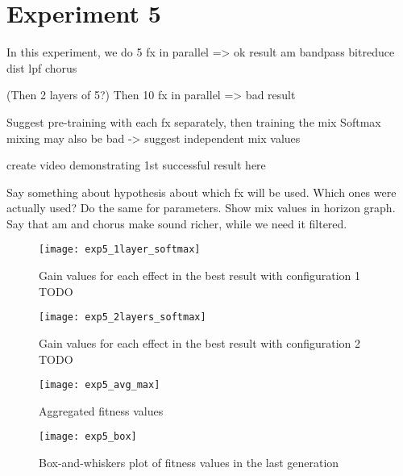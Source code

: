 \section{Experiment 5}
In this experiment, we do 5 fx in parallel => ok result
am
bandpass
bitreduce
dist lpf
chorus

(Then 2 layers of 5?)
Then 10 fx in parallel => bad result

Suggest pre-training with each fx separately, then training the mix
Softmax mixing may also be bad -> suggest independent mix values

create video demonstrating 1st successful result here

Say something about hypothesis about which fx will be used. Which ones were actually used? Do the same for parameters. Show mix values in horizon graph. Say that am and chorus make sound richer, while we need it filtered.

\begin{figure}[h]
    \centering
    \texttt{[image: exp5\_1layer\_softmax]}
    \caption{Gain values for each effect in the best result with configuration 1 TODO}
    \label{fig:exp5_1layer_softmax}
\end{figure}

\begin{figure}[h]
    \centering
    \texttt{[image: exp5\_2layers\_softmax]}
    \caption{Gain values for each effect in the best result with configuration 2 TODO}
    \label{fig:exp5_2layers_softmax}
\end{figure}

\begin{figure}[h]
    \centering
    \texttt{[image: exp5\_avg\_max]}
    \caption{Aggregated fitness values}
    \label{fig:exp5_avg_max}
\end{figure}

\begin{figure}[h]
    \centering
    \texttt{[image: exp5\_box]}
    \caption{Box-and-whiskers plot of fitness values in the last generation}
    \label{fig:exp5_box}
\end{figure}
